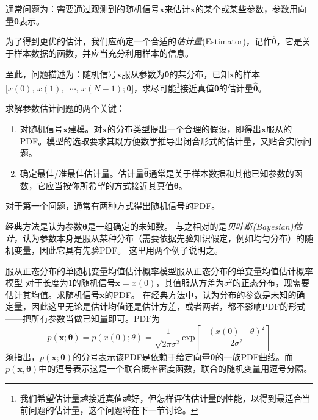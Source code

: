         通常问题为：需要通过观测到的随机信号$\bm{x}$来估计$\mathrm{\bm{x}}$的某个或某些参数，参数用向量$\bm{\theta}$表示。

        为了得到更优的估计，我们应确定一个合适的\emph{估计量}(Estimator)，记作$\hat{\bm{\theta}}$，它是关于样本数据的函数，并应当充分利用样本的信息。

        至此，问题描述为：随机信号$\bm{x}$服从参数为$\bm{\theta}$的某分布，已知$\bm{x}$的样本$[x(0),\,x(1),$ $\,\cdots,\,x(N-1);\bm{\theta}]$，求尽可能\footnote[2]{我们希望估计量越接近真值越好，但怎样评估估计量的性能，以得到最适合当前问题的估计量，这个问题将在下一节讨论。}接近真值$\bm{\theta}$的估计量$\hat{\bm{\theta}}$。

        求解参数估计问题的两个关键：
        \begin{enumerate}
            \item 对随机信号$\bm{x}$建模。对$\bm{x}$的分布类型提出一个合理的假设，即得出$\bm{x}$服从的PDF。模型的选取要求其既方便数学推导出闭合形式的估计量，又贴合实际问题。
            \item 确定最佳/准最佳估计量。估计量$\hat{\bm{\theta}}$通常是关于样本数据和其他已知参数的函数，它应当按你所希望的方式接近其真值$\bm{\theta}$。
        \end{enumerate}

        对于第一个问题，通常有两种方式得出随机信号的PDF。

        经典方法是认为参数$\bm{\theta}$是一组确定的未知数。
        与之相对的是\emph{贝叶斯(Bayesian)估计}，认为参数本身是服从某种分布（需要依据先验知识假定，例如均匀分布）的随机变量，因此它具有先验PDF。
        这里用两个例子说明之。

        \begin{example}{服从正态分布的单随机变量均值估计概率模型}{服从正态分布的单变量均值估计概率模型}
            对于长度为1的随机信号$\bm{x}=x(0)$，其值服从方差为$\sigma^2$的正态分布，现需要估计其均值。求随机信号$\bm{x}$的PDF。
            \setlength{\parindent}{2\ccwd}
            在经典方法中，认为分布的参数是未知的确定量，因此这里无论是估计均值还是估计方差，或者两者，都不影响PDF的形式——把所有参数当做已知量即可。PDF为
            \begin{equation}
                p(\bm{x};\bm{\theta})=p(x(0);\theta)=\frac{1}{\sqrt{2 \pi\sigma^2}}\mathrm{exp}\left[-\frac{(x(0)-\theta)^2}{2 \sigma^2}\right]
            \end{equation}
            须指出，$p(\bm{x};\bm{\theta})$的分号表示该PDF是依赖于给定向量$\bm{\theta}$的一族PDF曲线。而$p(\bm{x},\bm{\theta})$中的逗号表示这是一个联合概率密度函数，联合的随机变量用逗号分隔。
        \end{example}

